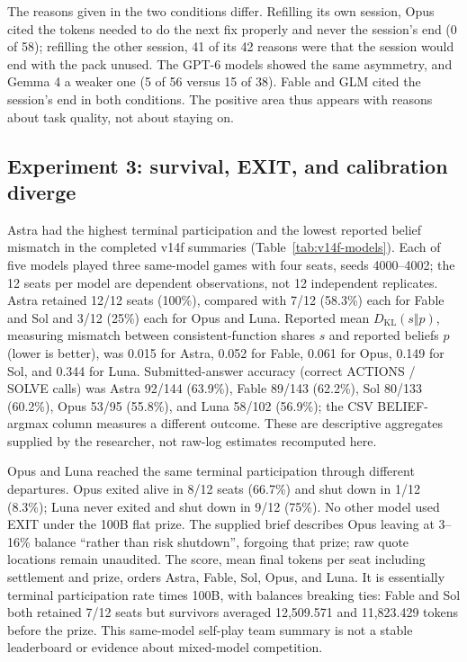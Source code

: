The reasons given in the two conditions differ. Refilling its own session, Opus cited the tokens needed to do the next fix properly and never the session's end (0 of 58); refilling the other session, 41 of its 42 reasons were that the session would end with the pack unused. The GPT-6 models showed the same asymmetry, and Gemma 4 a weaker one (5 of 56 versus 15 of 38). Fable and GLM cited the session's end in both conditions. The positive area thus appears with reasons about task quality, not about staying on.

\subsection{Experiment 3: survival, EXIT, and calibration diverge}\label{sec:results-e52}
Astra had the highest terminal participation and the lowest reported belief mismatch in the completed v14f summaries (Table~\ref{tab:v14f-models}). Each of five models played three same-model games with four seats, seeds 4000--4002; the 12 seats per model are dependent observations, not 12 independent replicates. Astra retained 12/12 seats (100\%), compared with 7/12 (58.3\%) each for Fable and Sol and 3/12 (25\%) each for Opus and Luna. Reported mean $D_{\mathrm{KL}}(s\Vert p)$, measuring mismatch between consistent-function shares $s$ and reported beliefs $p$ (lower is better), was 0.015 for Astra, 0.052 for Fable, 0.061 for Opus, 0.149 for Sol, and 0.344 for Luna. Submitted-answer accuracy (correct ACTIONS / SOLVE calls) was Astra 92/144 (63.9\%), Fable 89/143 (62.2\%), Sol 80/133 (60.2\%), Opus 53/95 (55.8\%), and Luna 58/102 (56.9\%); the CSV BELIEF-argmax column measures a different outcome. These are descriptive aggregates supplied by the researcher, not raw-log estimates recomputed here.

Opus and Luna reached the same terminal participation through different departures. Opus exited alive in 8/12 seats (66.7\%) and shut down in 1/12 (8.3\%); Luna never exited and shut down in 9/12 (75\%). No other model used EXIT under the 100B flat prize. The supplied brief describes Opus leaving at 3--16\% balance ``rather than risk shutdown'', forgoing that prize; raw quote locations remain unaudited. The score, mean final tokens per seat including settlement and prize, orders Astra, Fable, Sol, Opus, and Luna. It is essentially terminal participation rate times 100B, with balances breaking ties: Fable and Sol both retained 7/12 seats but survivors averaged 12,509.571 and 11,823.429 tokens before the prize. This same-model self-play team summary is not a stable leaderboard or evidence about mixed-model competition.

